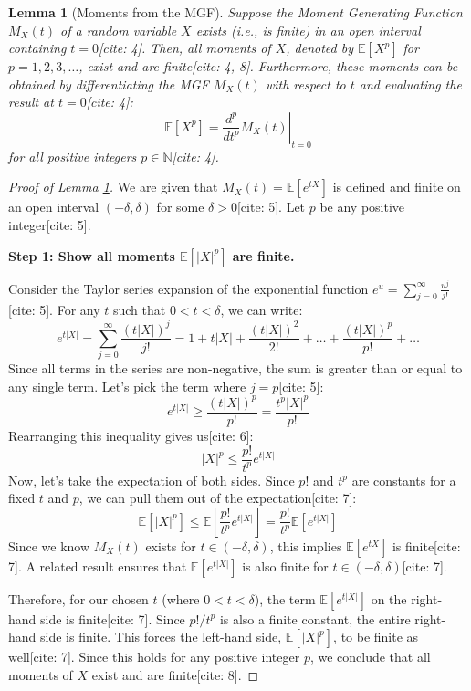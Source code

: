 \documentclass[12pt]{article}
\newtheorem{lemma}[theorem]{Lemma}
\begin{document}
\begin{lemma}[Moments from the MGF] \label{lemma:mgf_moments}
Suppose the Moment Generating Function $M_X(t)$ of a random variable $X$ exists (i.e., is finite) in an open interval containing $t=0$[cite: 4]. Then, all moments of $X$, denoted by $\mathbb{E}[X^p]$ for $p = 1, 2, 3, \dots$, exist and are finite[cite: 4, 8]. Furthermore, these moments can be obtained by differentiating the MGF $M_X(t)$ with respect to $t$ and evaluating the result at $t=0$[cite: 4]:
\[
\mathbb{E}[X^p] = \left. \frac{d^p}{dt^p} M_X(t) \right|_{t=0}
\]
for all positive integers $p \in \mathbb{N}$[cite: 4].
\end{lemma}

\begin{proof}[Proof of Lemma \ref{lemma:mgf_moments}]
We are given that $M_X(t) = \mathbb{E}[e^{tX}]$ is defined and finite on an open interval $(-\delta, \delta)$ for some $\delta > 0$[cite: 5]. Let $p$ be any positive integer[cite: 5].

\textbf{Step 1: Show all moments $\mathbb{E}[|X|^p]$ are finite.}

Consider the Taylor series expansion of the exponential function $e^u = \sum_{j=0}^{\infty} \frac{u^j}{j!}$[cite: 5]. For any $t$ such that $0 < t < \delta$, we can write:
\[
e^{t|X|} = \sum_{j=0}^{\infty} \frac{(t|X|)^j}{j!} = 1 + t|X| + \frac{(t|X|)^2}{2!} + \dots + \frac{(t|X|)^p}{p!} + \dots
\]
Since all terms in the series are non-negative, the sum is greater than or equal to any single term. Let's pick the term where $j=p$[cite: 5]:
\[
e^{t|X|} \ge \frac{(t|X|)^p}{p!} = \frac{t^p |X|^p}{p!}
\]
Rearranging this inequality gives us[cite: 6]:
\[
|X|^p \le \frac{p!}{t^p} e^{t|X|}
\]
Now, let's take the expectation of both sides. Since $p!$ and $t^p$ are constants for a fixed $t$ and $p$, we can pull them out of the expectation[cite: 7]:
\[
\mathbb{E}[|X|^p] \le \mathbb{E}\left[ \frac{p!}{t^p} e^{t|X|} \right] = \frac{p!}{t^p} \mathbb{E}[e^{t|X|}]
\]
Since we know $M_X(t)$ exists for $t \in (-\delta, \delta)$, this implies $\mathbb{E}[e^{tX}]$ is finite[cite: 7]. A related result ensures that $\mathbb{E}[e^{t|X|}]$ is also finite for $t \in (-\delta, \delta)$[cite: 7].

Therefore, for our chosen $t$ (where $0 < t < \delta$), the term $\mathbb{E}[e^{t|X|}]$ on the right-hand side is finite[cite: 7]. Since $p!/t^p$ is also a finite constant, the entire right-hand side is finite. This forces the left-hand side, $\mathbb{E}[|X|^p]$, to be finite as well[cite: 7].
Since this holds for any positive integer $p$, we conclude that all moments of $X$ exist and are finite[cite: 8].


\end{proof}
\end{document}
